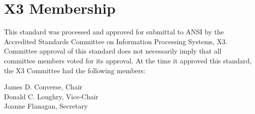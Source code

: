\chapter*{X3 Membership}

This standard was processed and approved for submittal to ANSI
by the Accredited Standards Committee on Information Processing
Systems, X3. Committee approval of this standard does not
necessarily imply that all committee members voted for its approval.
At the time it approved this standard, the X3 Committee had the
following members:

\begin{flushleft}
James D. Converse, Chair \\
Donald C. Loughry, Vice-Chair \\
Joanne Flanagan, Secretary
\end{flushleft}

